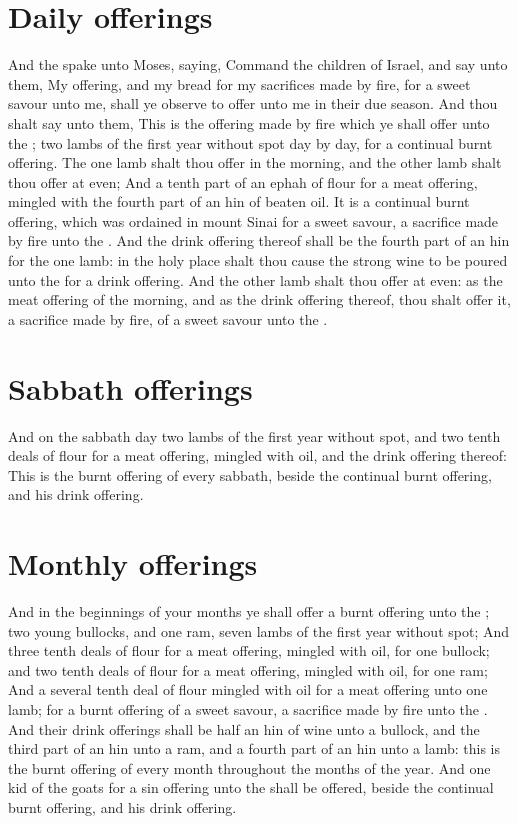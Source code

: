 \section*{Daily offerings}
\begin{biblechapter} %
\verse And the \LORD spake unto Moses, saying,
\verse Command the children of Israel, and say unto them, My offering, and my bread for my sacrifices made by fire, for a sweet savour unto me, shall ye observe to offer unto me in their due season.
\verse And thou shalt say unto them, This is the offering made by fire which ye shall offer unto the \LORD; two lambs of the first year without spot day by day, for a continual burnt offering.
\verse The one lamb shalt thou offer in the morning, and the other lamb shalt thou offer at even;
\verse And a tenth part of an ephah of flour for a meat offering, mingled with the fourth part of an hin of beaten oil.
\verse It is a continual burnt offering, which was ordained in mount Sinai for a sweet savour, a sacrifice made by fire unto the \LORD.
\verse And the drink offering thereof shall be the fourth part of an hin for the one lamb: in the holy place shalt thou cause the strong wine to be poured unto the \LORD for a drink offering.
\verse And the other lamb shalt thou offer at even: as the meat offering of the morning, and as the drink offering thereof, thou shalt offer it, a sacrifice made by fire, of a sweet savour unto the \LORD.
\section*{Sabbath offerings}
\verse And on the sabbath day two lambs of the first year without spot, and two tenth deals of flour for a meat offering, mingled with oil, and the drink offering thereof:
\verse This is the burnt offering of every sabbath, beside the continual burnt offering, and his drink offering.
\section*{Monthly offerings}
\verse And in the beginnings of your months ye shall offer a burnt offering unto the \LORD; two young bullocks, and one ram, seven lambs of the first year without spot;
\verse And three tenth deals of flour for a meat offering, mingled with oil, for one bullock; and two tenth deals of flour for a meat offering, mingled with oil, for one ram;
\verse And a several tenth deal of flour mingled with oil for a meat offering unto one lamb; for a burnt offering of a sweet savour, a sacrifice made by fire unto the \LORD.
\verse And their drink offerings shall be half an hin of wine unto a bullock, and the third part of an hin unto a ram, and a fourth part of an hin unto a lamb: this is the burnt offering of every month throughout the months of the year.
\verse And one kid of the goats for a sin offering unto the \LORD shall be offered, beside the continual burnt offering, and his drink offering.

\end{biblechapter}
